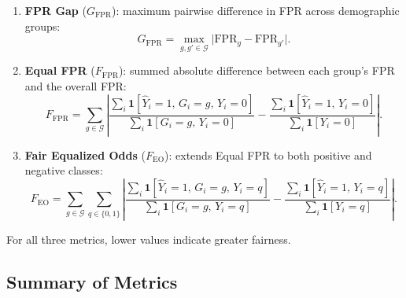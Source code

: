 \begin{enumerate}
  \item \textbf{FPR Gap} ($G_{\mathrm{FPR}}$): maximum pairwise
        difference in FPR across demographic groups:
        \begin{equation}
          G_{\mathrm{FPR}}
          = \max_{g,g' \in \mathcal{G}}
            \bigl|\mathrm{FPR}_g - \mathrm{FPR}_{g'}\bigr|.
          \label{eq:fpr_gap}
        \end{equation}

  \item \textbf{Equal FPR} ($F_{\mathrm{FPR}}$): summed absolute
        difference between each group's FPR and the overall FPR:
        \begin{equation}
          F_{\mathrm{FPR}}
          = \sum_{g \in \mathcal{G}}
            \left|
              \frac{\sum_i \mathbf{1}[\hat{Y}_i=1,\,G_i=g,\,Y_i=0]}
                   {\sum_i \mathbf{1}[G_i=g,\,Y_i=0]}
              -
              \frac{\sum_i \mathbf{1}[\hat{Y}_i=1,\,Y_i=0]}
                   {\sum_i \mathbf{1}[Y_i=0]}
            \right|.
          \label{eq:equal_fpr}
        \end{equation}

  \item \textbf{Fair Equalized Odds} ($F_{\mathrm{EO}}$):
        extends Equal FPR to both positive and negative classes:
        \begin{equation}
          F_{\mathrm{EO}}
          = \sum_{g \in \mathcal{G}} \sum_{q \in \{0,1\}}
            \left|
              \frac{\sum_i \mathbf{1}[\hat{Y}_i=1,\,G_i=g,\,Y_i=q]}
                   {\sum_i \mathbf{1}[G_i=g,\,Y_i=q]}
              -
              \frac{\sum_i \mathbf{1}[\hat{Y}_i=1,\,Y_i=q]}
                   {\sum_i \mathbf{1}[Y_i=q]}
            \right|.
          \label{eq:fair_eo}
        \end{equation}
\end{enumerate}
For all three metrics, lower values indicate greater fairness.

\subsection{Summary of Metrics}
\label{subsec:metrics_summary}

